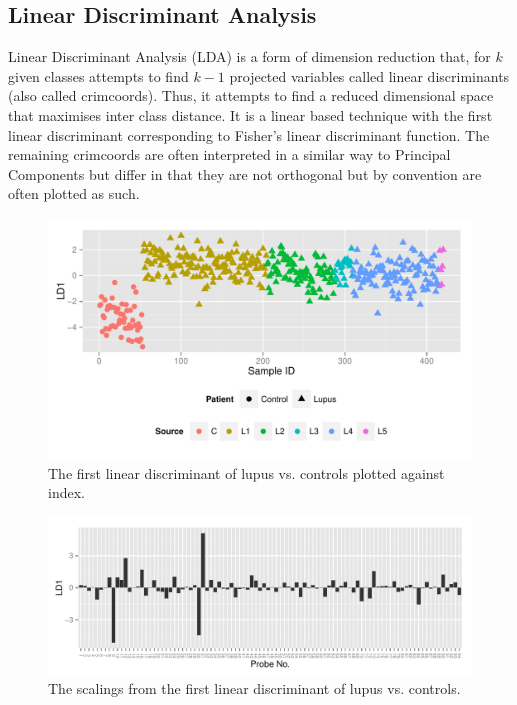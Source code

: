 \documentclass[a4paper, 12pt]{report}
\begin{document}

\subsection*{Linear Discriminant Analysis}
Linear Discriminant Analysis (\gls{LDA}) is a form of dimension reduction that, for $k$ given classes attempts to find $k-1$ projected variables called linear discriminants (also called crimcoords). Thus, it attempts to find a reduced dimensional space that maximises inter class distance. It is a linear based technique with the first linear discriminant corresponding to Fisher's linear discriminant function. The remaining crimcoords are often interpreted in a similar way to Principal Components but differ in that they are not orthogonal but by convention are often plotted as such. 

\begin{figure}[H]
\begin{centering}
\includegraphics[width=\textwidth]{lda} 
\caption{The first linear discriminant of lupus vs. controls plotted against index.} 
 \label{F:LDA}
\end{centering}
\end{figure}

\begin{figure}[H]
\begin{centering}
\includegraphics[width=\textwidth]{ldaScalings} 
\caption{The scalings from the first linear discriminant of lupus vs. controls.} 
 \label{F:LDAScalings}
\end{centering}
\end{figure}
\end{document}
